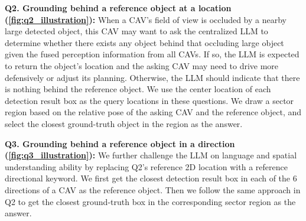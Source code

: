 \noindent\textbf{Q2. Grounding behind a reference object at a location (\cref{fig:q2_illustration}):}
When a CAV's field of view is occluded by a nearby large detected object, this CAV may want to ask the centralized LLM to determine whether there exists any object behind that occluding large object given the fused perception information from all CAVs. If so, the LLM is expected to return the object's location and the asking CAV may need to drive more defensively or adjust its planning. Otherwise, the LLM should indicate that there is nothing behind the reference object.
We use the center location of each detection result box as the query locations in these questions. We draw a sector region based on the relative pose of the asking CAV and the reference object, and select the closest ground-truth object in the region as the answer.


\noindent\textbf{Q3. Grounding behind a reference object in a direction (\cref{fig:q3_illustration}):}
We further challenge the LLM on language and spatial understanding ability by replacing Q2's reference 2D location with a reference directional keyword.
We first get the closest detection result box in each of the $6$ directions of a CAV as the reference object. Then we follow the same approach in Q2 to get the closest ground-truth box in the corresponding sector region as the answer.



